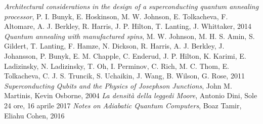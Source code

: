 \newpage
\begin{thebibliography}{99}
    \textit{Architectural considerations in the design of a superconducting quantum annealing processor},
    P. I. Bunyk, E. Hoskinson, M. W. Johnson, E. Tolkacheva, F. Altomare, A. J. Berkley, R. Harris, J. P. Hilton, T. Lanting, J. Whittaker,
    2014
    \textit{Quantum annealing with manufactured spins},
    M. W. Johnson, M. H. S. Amin, S. Gildert, T. Lanting, F. Hamze, N. Dickson, R. Harris, A. J. Berkley, J. Johansson, P. Bunyk, E. M. Chapple, C. Enderud, J. P. Hilton, K. Karimi, E. Ladizinsky, N. Ladizinsky, T. Oh, I. Perminov, C. Rich, M. C. Thom, E. Tolkacheva, C. J. S. Truncik, S. Uchaikin, J. Wang, B. Wilson, G. Rose,
    2011
    \textit{Superconducting Qubits and the Physics of Josephson Junctions},
    John M. Martinis, Kevin Osborne,
    2004
    \textit{La densità della leggedi Moore},
    Antonio Dini,
    Sole 24 ore,
    16 aprile 2017
    \textit{Notes on Adiabatic Quantum Computers},
    Boaz Tamir, Eliahu Cohen,
    2016

\end{thebibliography}

